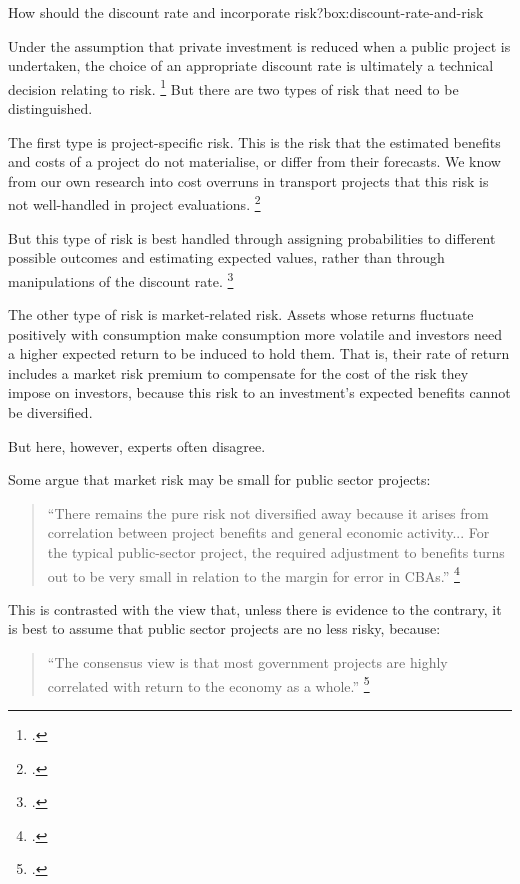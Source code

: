 \begin{bigbox}{How should the discount rate and incorporate risk?}{box:discount-rate-and-risk}

Under the assumption that private investment is reduced when a public project is undertaken, the choice of an appropriate discount rate  is ultimately a technical decision relating to risk.%
	\footcite[][27]{Grimes-Beyond-Simple-CBA}
But there are two types of risk that need to be distinguished. 

The first type is project-specific risk. This is the risk that the estimated benefits and costs of a project do not materialise, or differ from their forecasts. We know from our own research into cost overruns in transport projects that this risk is not well-handled in project evaluations.%
	\footcite{Terrill-etal-2016-Cost-overruns-in-transport-infrastructure}

But this type of risk is best handled through assigning probabilities to different possible outcomes and estimating expected values, rather than through manipulations of the discount rate.%
	\footcite[][v]{BITRE2005RiskinCostBenefitAnalysis}

The other type of risk is market-related risk. Assets whose returns fluctuate positively with consumption make consumption more volatile and investors need a higher expected return to be induced to hold them. That is, their rate of return includes a market risk premium to compensate for the cost of the risk they impose on investors, because this risk to an investment's expected benefits cannot be diversified. 

But here, however, experts often disagree. 

Some argue that market risk may be small for public sector projects:
\begin{quote}
\textquotedblleft {\small There remains the pure risk not diversified away because it arises from correlation between project benefits and general economic activity... For the typical public-sector project, the required adjustment to benefits turns out to be very small in relation to the margin for error in CBAs.''}%
	\footcite[][v]{BITRE2005RiskinCostBenefitAnalysis}
\end{quote}

This is contrasted with the view that, unless there is evidence to the contrary, it is best to assume that public sector projects are no less risky, because:
\begin{quote}
\textquotedblleft {\small The consensus view is that most government projects are highly correlated with return to the economy as a whole.''}%
	\footcite[][60]{ Harrison-Valuing-the-Future}
\end{quote}


\end{bigbox}
